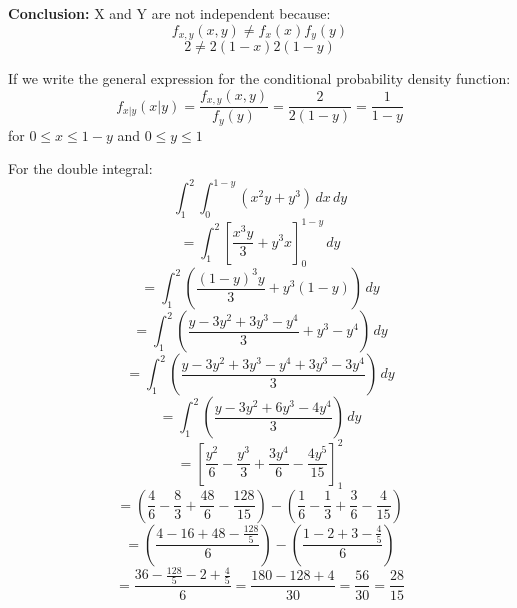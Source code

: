\documentclass{article}
\begin{document}
       \begin{center}
    \end{center}
       
    \textbf{Conclusion:} X and Y are not independent because:
    \[f_{x,y}(x,y) \neq f_x(x)f_y(y)\]
    \[2 \neq 2(1-x)2(1-y)\]


    If we write the general expression for the conditional probability density function:
    \[
        f_{x|y}(x|y) = \frac{f_{x,y}(x,y)}{f_y(y)} = \frac{2}{2(1-y)} = \frac{1}{1-y}
    \]
    for $0 \leq x \leq 1-y$ and $0 \leq y \leq 1$

    For the double integral:
    \[
        \int_{1}^{2} \int_{0}^{1-y} (x^2y+y^3) \, dx \, dy
    \]
    \[
        = \int_{1}^{2} \left[\frac{x^3y}{3} + y^3x\right]_{0}^{1-y} \, dy
    \]
    \[
        = \int_{1}^{2} \left(\frac{(1-y)^3y}{3} + y^3(1-y)\right) \, dy
    \]
    \[
        = \int_{1}^{2} \left(\frac{y-3y^2+3y^3-y^4}{3} + y^3-y^4\right) \, dy
    \]
    \[
        = \int_{1}^{2} \left(\frac{y-3y^2+3y^3-y^4+3y^3-3y^4}{3}\right) \, dy
    \]
    \[
        = \int_{1}^{2} \left(\frac{y-3y^2+6y^3-4y^4}{3}\right) \, dy
    \]
    \[
        = \left[\frac{y^2}{6}-\frac{y^3}{3}+\frac{3y^4}{6}-\frac{4y^5}{15}\right]_{1}^{2}
    \]
    \[
        = \left(\frac{4}{6}-\frac{8}{3}+\frac{48}{6}-\frac{128}{15}\right) - \left(\frac{1}{6}-\frac{1}{3}+\frac{3}{6}-\frac{4}{15}\right)
    \]
    \[
        = \left(\frac{4-16+48-\frac{128}{5}}{6}\right) - \left(\frac{1-2+3-\frac{4}{5}}{6}\right)
    \]
    \[
        = \frac{36-\frac{128}{5}-2+\frac{4}{5}}{6} = \frac{180-128+4}{30} = \frac{56}{30} = \boxed{\frac{28}{15}}
    \]
    
\end{document}
